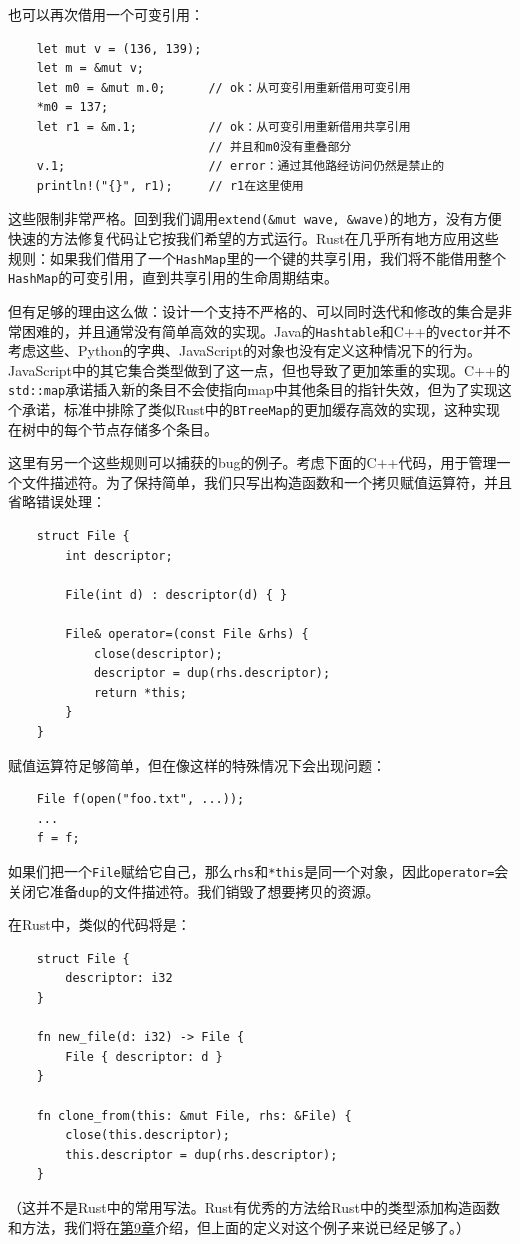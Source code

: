 也可以再次借用一个可变引用：
\begin{verbatim}
    let mut v = (136, 139);
    let m = &mut v;
    let m0 = &mut m.0;      // ok：从可变引用重新借用可变引用
    *m0 = 137;
    let r1 = &m.1;          // ok：从可变引用重新借用共享引用
                            // 并且和m0没有重叠部分
    v.1;                    // error：通过其他路经访问仍然是禁止的
    println!("{}", r1);     // r1在这里使用
\end{verbatim}

这些限制非常严格。回到我们调用\texttt{extend(\&mut wave, \&wave)}的地方，没有方便快速的方法修复代码让它按我们希望的方式运行。Rust在几乎所有地方应用这些规则：如果我们借用了一个\texttt{HashMap}里的一个键的共享引用，我们将不能借用整个\texttt{HashMap}的可变引用，直到共享引用的生命周期结束。

但有足够的理由这么做：设计一个支持不严格的、可以同时迭代和修改的集合是非常困难的，并且通常没有简单高效的实现。Java的\texttt{Hashtable}和C++的\texttt{vector}并不考虑这些、Python的字典、JavaScript的对象也没有定义这种情况下的行为。JavaScript中的其它集合类型做到了这一点，但也导致了更加笨重的实现。C++的\texttt{std::map}承诺插入新的条目不会使指向map中其他条目的指针失效，但为了实现这个承诺，标准中排除了类似Rust中的\texttt{BTreeMap}的更加缓存高效的实现，这种实现在树中的每个节点存储多个条目。

这里有另一个这些规则可以捕获的bug的例子。考虑下面的C++代码，用于管理一个文件描述符。为了保持简单，我们只写出构造函数和一个拷贝赋值运算符，并且省略错误处理：
\begin{verbatim}
    struct File {
        int descriptor;

        File(int d) : descriptor(d) { }

        File& operator=(const File &rhs) {
            close(descriptor);
            descriptor = dup(rhs.descriptor);
            return *this;
        }
    }
\end{verbatim}

赋值运算符足够简单，但在像这样的特殊情况下会出现问题：
\begin{verbatim}
    File f(open("foo.txt", ...));
    ...
    f = f;
\end{verbatim}

如果们把一个\texttt{File}赋给它自己，那么\texttt{rhs}和\texttt{*this}是同一个对象，因此\texttt{operator=}会关闭它准备\texttt{dup}的文件描述符。我们销毁了想要拷贝的资源。

在Rust中，类似的代码将是：
\begin{verbatim}
    struct File {
        descriptor: i32
    }

    fn new_file(d: i32) -> File {
        File { descriptor: d }
    }

    fn clone_from(this: &mut File, rhs: &File) {
        close(this.descriptor);
        this.descriptor = dup(rhs.descriptor);
    }
\end{verbatim}
（这并不是Rust中的常用写法。Rust有优秀的方法给Rust中的类型添加构造函数和方法，我们将在\hyperref[ch09]{第9章}介绍，但上面的定义对这个例子来说已经足够了。）

